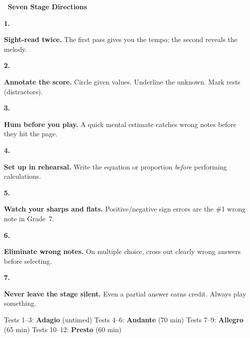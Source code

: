 {\vspace{2mm}

\noindent\textcolor{musBlack}{\large\bfseries\faTheaterMasks~Seven Stage Directions}

\vspace{2mm}

\newcommand{\stageDir}[3]{%
    \noindent
    \begin{minipage}[t]{0.06\linewidth}
        \centering
        \textcolor{#2}{\fontsize{16}{16}\selectfont\bfseries #1.}
    \end{minipage}%
    \begin{minipage}[t]{0.92\linewidth}
        \small #3
    \end{minipage}
    \vspace{2mm}
}

\stageDir{1}{musGold!90!black}{%
    \textbf{Sight-read twice.} The first pass gives you the tempo; the second reveals the melody.
}
\stageDir{2}{musBurgundy}{%
    \textbf{Annotate the score.} Circle given values. Underline the unknown. Mark rests (distractors).
}
\stageDir{3}{musBlack}{%
    \textbf{Hum before you play.} A quick mental estimate catches wrong notes before they hit the page.
}
\stageDir{4}{musGold!90!black}{%
    \textbf{Set up in rehearsal.} Write the equation or proportion \textit{before} performing calculations.
}
\stageDir{5}{musBurgundy}{%
    \textbf{Watch your sharps and flats.} Positive/negative sign errors are the \#1 wrong note in Grade~7.
}
\stageDir{6}{musBlack}{%
    \textbf{Eliminate wrong notes.} On multiple choice, cross out clearly wrong answers before selecting.
}
\stageDir{7}{musCrimson}{%
    \textbf{Never leave the stage silent.} Even a partial answer earns credit. Always play something.
}

\vspace{2mm}

\begin{tcolorbox}[
    enhanced,
    colback=musGold!5,
    colframe=musGold!35,
    arc=4pt, boxrule=0.8pt,
    left=5mm, right=5mm, top=3mm, bottom=3mm,
    title={\small\textcolor{white}{\faClock~Tempo Markings}},
    colbacktitle=musGold!65,
    fonttitle=\bfseries\sffamily,
    borderline west={3pt}{0pt}{musGold!45},
]
    \small\centering
    Tests 1--3: \textbf{Adagio} (untimed)
    \;\textcolor{musGold!40}{\faAngleRight}\;
    Tests 4--6: \textbf{Andante} (70 min)
    \;\textcolor{musGold!40}{\faAngleRight}\;
    Tests 7--9: \textbf{Allegro} (65 min)
    \;\textcolor{musGold!40}{\faAngleRight}\;
    Tests 10--12: \textbf{Presto} (60 min)
\end{tcolorbox}

}
